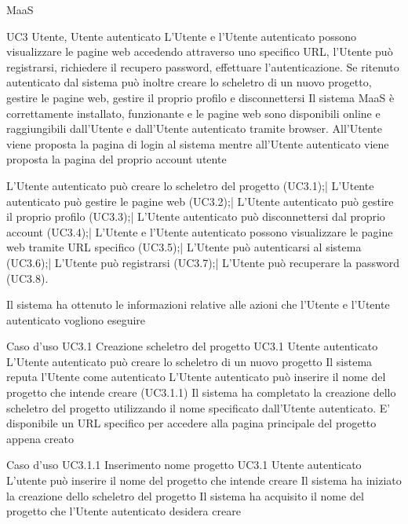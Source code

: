 
{MaaS}

\UC
{UC3}
{Utente, Utente autenticato}
{L'Utente e l'Utente autenticato possono visualizzare le pagine web accedendo attraverso uno specifico URL, l'Utente può registrarsi, richiedere il recupero password, effettuare l'autenticazione. Se ritenuto autenticato dal sistema può inoltre creare lo scheletro di un nuovo progetto, gestire le pagine web, gestire il proprio profilo e disconnettersi}
{Il sistema MaaS è correttamente installato, funzionante e le pagine web sono disponibili online e raggiungibili dall'Utente e dall'Utente autenticato tramite browser. All'Utente viene proposta la pagina di login al sistema mentre all'Utente autenticato viene proposta la pagina del proprio account utente}

\scenario
{L'Utente autenticato può creare lo scheletro del progetto (UC3.1);|
L'Utente autenticato può  gestire le pagine web (UC3.2);|
L'Utente autenticato può  gestire il proprio profilo (UC3.3);|
L'Utente autenticato può  disconnettersi dal proprio account (UC3.4);|
L'Utente e l'Utente autenticato possono visualizzare le pagine web tramite URL specifico (UC3.5);|
L'Utente può autenticarsi al sistema (UC3.6);|
L'Utente può registrarsi (UC3.7);|
L'Utente può recuperare la password (UC3.8).
}

\post
{Il sistema ha ottenuto le informazioni relative alle azioni che l'Utente e l'Utente autenticato vogliono eseguire}


\UCtitle
{Caso d'uso UC3.1}  
{Creazione scheletro del progetto}	
\UC	
{UC3.1}		
{Utente autenticato}
{L'Utente autenticato può creare lo scheletro di un nuovo progetto}
{Il sistema reputa l'Utente come autenticato}
\scenario
{L'Utente autenticato può inserire il nome del progetto che intende creare (UC3.1.1)}
\post
{Il sistema ha completato la creazione dello scheletro del progetto utilizzando il nome specificato dall'Utente autenticato. E' disponibile un URL specifico per accedere alla pagina principale del progetto appena creato}

\UCtitle
{Caso d'uso UC3.1.1}  
{Inserimento nome progetto}	
\UC	
{UC3.1}		
{Utente autenticato}
{L'utente può inserire il nome del progetto che intende creare}
{Il sistema ha iniziato la creazione dello scheletro del progetto}
\post
{Il sistema ha acquisito il nome del progetto che l'Utente autenticato desidera creare}

